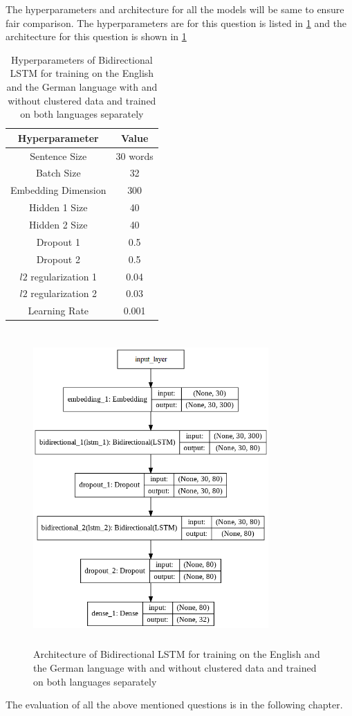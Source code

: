 The hyperparameters and architecture for all the models will be same to ensure fair comparison. The hyperparameters are for this question is listed in \ref{table:hyperParameterQuestion3} and the architecture for this question is shown in \ref{fig:architectureQuestion3}

\begin{table}[!ht]
\centering
\begin{tabular}{cc}
\hline
\textbf{Hyperparameter} & \textbf{Value} \\ \hline
Sentence Size & 30 words \\
Batch Size & 32 \\
Embedding Dimension & 300 \\
Hidden 1 Size & 40 \\
Hidden 2 Size & 40 \\
Dropout 1 & 0.5 \\
Dropout 2 & 0.5 \\
$l2$ regularization 1 & 0.04 \\
$l2$ regularization 2 & 0.03 \\
Learning Rate & 0.001 \\ \hline
\end{tabular}
\captionsetup{justification=centering,margin=2cm}
\caption{Hyperparameters of Bidirectional LSTM for training on the English and the German language with and without clustered data and trained on both languages separately}
\label{table:hyperParameterQuestion3}
\end{table}

\begin{figure}[!ht]
    \centering
    \includegraphics[width=9cm, height=12cm]{pics/Question3.png}
    \captionsetup{justification=centering,margin=2cm}
    \caption{Architecture of Bidirectional LSTM for training on the English and the German language with and without clustered data and trained on both languages separately}
    \label{fig:architectureQuestion3}
\end{figure}

The evaluation of all the above mentioned questions is in the following chapter.